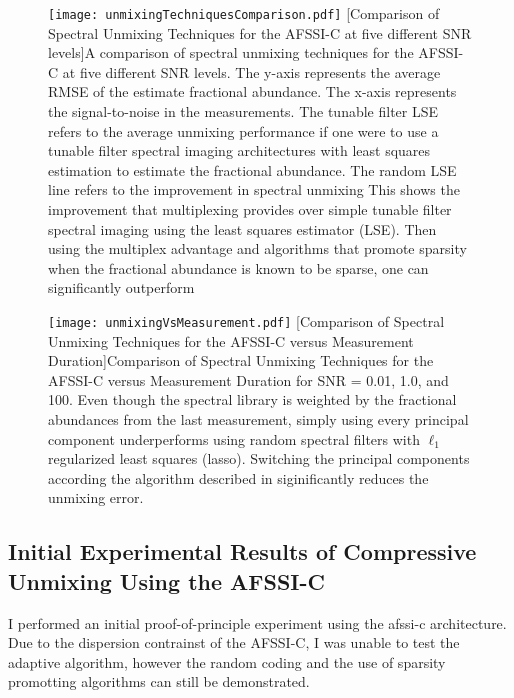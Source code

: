 \begin{figure}
	\centering
	\texttt{[image: unmixingTechniquesComparison.pdf]}
	[Comparison of Spectral Unmixing Techniques for the AFSSI-C at five different SNR levels]{A comparison of spectral unmixing techniques for the AFSSI-C at five different SNR levels. The y-axis represents the average RMSE of the estimate fractional abundance. The x-axis represents the signal-to-noise in the measurements. The tunable filter LSE refers to the average unmixing performance if one were to use a tunable filter spectral imaging architectures with least squares estimation to estimate the fractional abundance. The random LSE line refers to the improvement in spectral unmixing This shows the improvement that multiplexing provides over simple tunable filter spectral imaging using the least squares estimator (LSE). Then using the multiplex advantage and algorithms that promote sparsity when the fractional abundance is known to be sparse, one can significantly outperform }
	\label{fig:unmixingTechniquesComparison}
\end{figure}

\begin{figure}
	\centering
	\texttt{[image: unmixingVsMeasurement.pdf]}
	[Comparison of Spectral Unmixing Techniques for the AFSSI-C versus Measurement Duration]{Comparison of Spectral Unmixing Techniques for the AFSSI-C versus Measurement Duration for SNR = 0.01, 1.0, and 100. Even though the spectral library is weighted by the fractional abundances from the last measurement, simply using every principal component underperforms using random spectral filters with $\ell_1$ regularized least squares (lasso). Switching the principal components according the algorithm described in  siginificantly reduces the unmixing error. }
	\label{fig:unmixingVsMeasurement}
\end{figure}


\subsection{Initial Experimental Results of Compressive Unmixing Using the AFSSI-C}

I performed an initial proof-of-principle experiment using the \gls{afssi-c} architecture. Due to the dispersion contrainst of the AFSSI-C, I was unable to test the adaptive algorithm, however the random coding and the use of sparsity promotting algorithms can still be demonstrated. 


